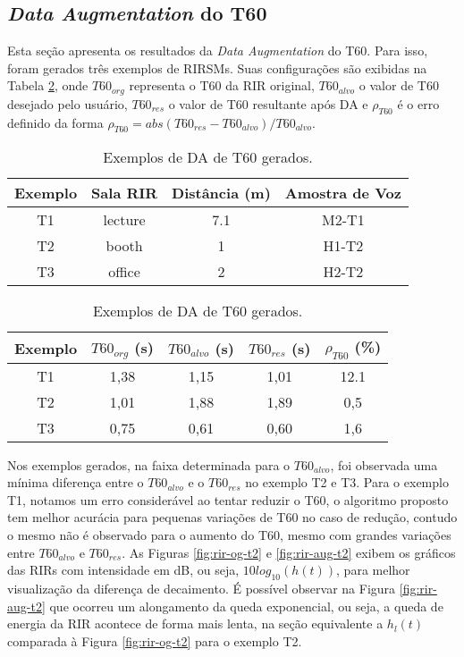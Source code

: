 \subsection{\textit{Data Augmentation} do T60}

Esta seção apresenta os resultados da \textit{Data Augmentation} do T60. Para isso, foram gerados três exemplos de RIRSMs. Suas configurações
são exibidas na Tabela \ref{tbl:da-t60}, onde $T60_{org}$ representa o T60 da RIR original, $T60_{alvo}$ o valor de T60 desejado pelo usuário,
$T60_{res}$ o valor de T60 resultante após DA e $\rho_{T60}$ é o erro definido da forma $\rho_{T60} = abs(T60_{res} - T60_{alvo})/T60_{alvo}$.

\begin{table} [H]
    \centering
    \caption{Exemplos de DA de T60 gerados.}
    \label{tbl:da-t60}
    \begin{tabular}{c|c|c|c}

        \textbf{Exemplo} & 
        \textbf{Sala RIR} & 
        \textbf{Distância (m)} &
        \textbf{Amostra de Voz} \\
        \hline 

        T1 & lecture & 7.1 & M2-T1 \\
        T2 & booth & 1 & H1-T2 \\
        T3 & office & 2 & H2-T2 \\

    \end{tabular}
    \bigbreak
    \bigbreak
    \begin{tabular}{c|c|c|c|c}

        \textbf{Exemplo} & 
        \textbf{$T60_{org}$ (s)} & 
        \textbf{$T60_{alvo}$ (s)} &
        \textbf{$T60_{res}$ (s)} & 
        \textbf{$\rho_{T60}$ (\%)} \\
        \hline 

        T1 & 1,38 & 1,15 & 1,01 & 12.1 \\
        T2 & 1,01 & 1,88 & 1,89 & 0,5 \\
        T3 & 0,75 & 0,61 & 0,60 & 1,6 \\

    \end{tabular}
\end{table}

Nos exemplos gerados, na faixa determinada para o $T60_{alvo}$, foi observada uma mínima diferença entre o $T60_{alvo}$ e o $T60_{res}$ no exemplo T2 e T3.
Para o exemplo T1, notamos um erro considerável ao tentar reduzir o T60, o algoritmo proposto tem melhor acurácia para pequenas variações de T60 no caso de
redução, contudo o mesmo não é observado para o aumento do T60, mesmo com grandes variações entre $T60_{alvo}$ e $T60_{res}$.
As Figuras \ref{fig:rir-og-t2} e \ref{fig:rir-aug-t2} exibem os gráficos das RIRs com intensidade em dB, ou seja, $10 log_{10}(h(t))$, para melhor 
visualização da diferença de decaimento. 
É possível observar na Figura \ref{fig:rir-aug-t2} que ocorreu um alongamento da queda exponencial, ou seja, a queda de energia da RIR
acontece de forma mais lenta, na seção equivalente a $h_l(t)$ comparada à Figura \ref{fig:rir-og-t2} para o exemplo T2.

